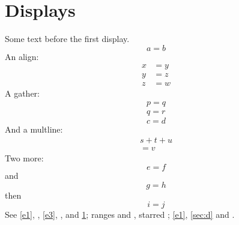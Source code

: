 \documentclass{article}
\begin{document}
\section{Displays}\label{sec:d}
Some text before the first display.
\begin{equation}\label{e1}
a = b
\end{equation}
An align:
\begin{align}
x &= y\\
y &= z\\
z &= w \nonumber
\end{align}
A gather:
\begin{gather}
p = q\\
q = r
\end{gather}
\begin{equation}\label{e2}
c = d
\end{equation}
And a multline:
\begin{multline}
s + t + u \\
= v
\end{multline}
Two more:
\begin{equation}\label{e3}
e = f
\end{equation}
and
\begin{equation}\label{e4}
g = h
\end{equation}
then
\begin{equation}\label{e5}
i = j
\end{equation}
See \cref{e1}, , \cref*{e3}, ,  and \cref{sec:d}; ranges  and , starred ; \autoref{e1}, \autoref{sec:d} and .
\end{document}
